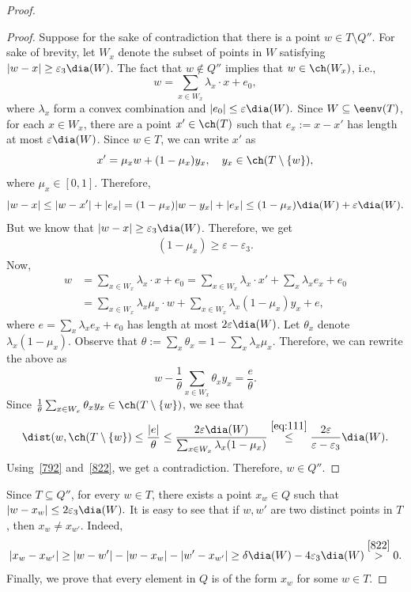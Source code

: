 \begin{proof}
\begin{proof}
Suppose for the sake of contradiction that there is a point $w \in T \setminus Q''$.  For sake of brevity, let $W_x$ denote the subset of points in $W$ satisfying $|w-x|  \geq \varepsilon_3 \dia(W)$. The fact that $w \notin Q''$ implies that $w \in \ch(W_x)$, i.e., 
$$ w = \sum_{x \in W_x} \lambda_x \cdot x + e_0, $$
where $\lambda_x$ form a convex combination and $|e_0| \leq \varepsilon \dia(W).$ Since $W \subseteq \eenv(T)$, for each $x \in W_x$, there are a point $x' \in \ch(T)$ such that $e_x := x-x'$ has length at most $\varepsilon \dia(W)$. Since $w \in T$, we can write $x'$ as 
$$ x' = \mu_x w + (1-\mu_x) y_x, \quad y_x \in \ch(T \setminus \{w\}), $$
where $\mu_x \in [0,1]$. 
Therefore, 
$$ |w-x| \leq |w-x'| + |e_x| = (1-\mu_x) |w-y_x| + |e_x| \leq (1-\mu_x) \dia(W) + \varepsilon \dia(W). $$
But we know that $|w-x| \geq \varepsilon_3 \dia(W)$. Therefore, we get
\begin{align}
\label{eq:111}
(1- \mu_x) \geq \varepsilon - \varepsilon_3. 
\end{align}
Now, 
\begin{align*}
w & = \sum_{x \in W_x} \lambda_x \cdot x + e_0 = \sum_{x \in W_x} \lambda_x \cdot x' + \sum_x \lambda_x e_x + e_0 \\
& = \sum_{x \in W_x} \lambda_x \mu_x \cdot w + \sum_{x \in W_x} \lambda_x (1 - \mu_x) y_x + e,  
\end{align*}
where $e = \sum_x \lambda_x e_x + e_0$ has length at most $2\varepsilon \dia(W)$. 
Let $\theta_x$ denote $\lambda_x(1-\mu_x)$. Observe that $\theta:= \sum_x \theta_x = 1 - \sum_x \lambda_x \mu_x$. Therefore, we can rewrite the above as 
$$ w - \frac{1}{\theta} \sum_{x \in W_x} \theta_x y_x = \frac{e}{\theta}. $$
Since $\frac{1}{\theta} \sum_{x \in W_x} \theta_x y_x \in \ch(T \setminus \{w\})$, we see that 
$$ \dist(w, \ch(T \setminus \{w\}) \leq \frac{|e|}{\theta} \leq 
\frac{2\varepsilon \dia(W)}{\sum_{x \in W_x} \lambda_x (1-\mu_x)} 
\stackrel{\eqref{eq:111}}{\leq} \frac{2\varepsilon}{\varepsilon-\varepsilon_3} \dia(W). $$
Using~\eqref{792} and~\eqref{822}, we get a contradiction. Therefore, $w \in Q''$. 
\end{proof}

Since $T \subseteq Q''$, for every $w \in T$, there exists a point $x_w \in Q$ such that $|w-x_w| \leq 2 \varepsilon_3 \dia(W). $ It is easy to see that if $w, w'$ are two distinct points in $T$, then $x_w \neq x_{w'}$. Indeed, 
$$ |x_w - x_{w'}| \geq |w-w'| - |w-x_w| - |w'-x_{w'}| \geq \delta \dia(W) - 4 \varepsilon_3 \dia(W) \stackrel{\eqref{822}}{>} 0. $$
Finally, we prove that every element in $Q$ is of the form $x_w$ for some $w \in T$. 


\end{proof}
